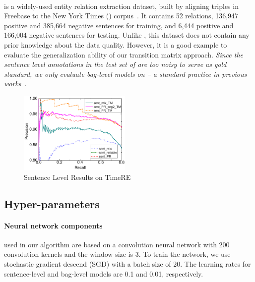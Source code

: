 \paragraph{\EntityRE} is a widely-used entity
relation extraction dataset, built %
by aligning triples
in Freebase to the New York Times (\NYT) corpus~\cite{riedel2010modeling}. It contains 52 relations, 136,947 positive and 385,664 negative sentences for training, and 6,444 positive and 166,004 negative sentences  for testing.
Unlike \TimeRE, this dataset does not contain any prior knowledge about the data quality.
However, it is a good example to evaluate the generalization ability of our transition matrix approach.
\emph{Since the sentence level annotations in the test set of \EntityRE are too noisy to serve as gold standard,  we only evaluate bag-level models on \EntityRE -- a standard practice in previous works}~\cite{surdeanu2012multi,zeng2015distant,lin2016neural}.


\begin{figure}[t!]
\begin{center}
\includegraphics[width=0.48\textwidth]{figures/sent_time_exp_overall.pdf}
\caption{Sentence Level Results on TimeRE}
\label{fig: sent_luo}
\end{center}
\end{figure}


\subsection{Hyper-parameters}

\paragraph{Neural network components} used in our algorithm are based on a convolution neural network with 200 convolution kernels and the window size is 3. To train the network, we use stochastic gradient descend (SGD) with a batch size of 20.  The learning rates for sentence-level  and bag-level models are 0.1 and 0.01, respectively.

